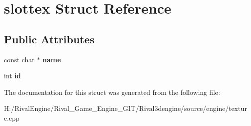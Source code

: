 \hypertarget{structslottex}{}\section{slottex Struct Reference}
\label{structslottex}
\subsection*{Public Attributes}
\begin{DoxyCompactItemize}
\item 
\mbox{\label{structslottex_a029b6fed72da721ef9048b6d14451e3a}} 
const char $\ast$ {\bfseries name}
\item 
\mbox{\label{structslottex_a7b3bb1ffe243dd4017f1507c4ff79176}} 
int {\bfseries id}
\end{DoxyCompactItemize}


The documentation for this struct was generated from the following file\+:\begin{DoxyCompactItemize}
\item 
H\+:/\+Rival\+Engine/\+Rival\+\_\+\+Game\+\_\+\+Engine\+\_\+\+G\+I\+T/\+Rival3dengine/source/engine/texture.\+cpp\end{DoxyCompactItemize}
